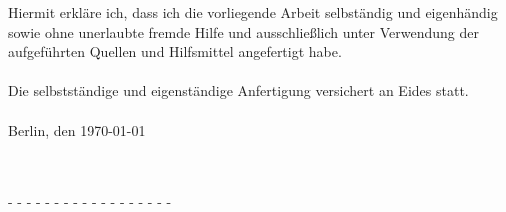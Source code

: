 
\thispagestyle{fancy}
\newpage
\noindent
Hiermit erkläre ich, dass ich die vorliegende Arbeit selbständig und eigenhändig sowie
ohne unerlaubte fremde Hilfe und ausschließlich unter Verwendung der aufgeführten Quellen und Hilfsmittel angefertigt habe.
\\
\\
Die selbstständige und eigenständige Anfertigung versichert an Eides statt.
\\
\\
Berlin, den \today
\vspace{1cm}
\begin{tabular}{@{}l@{}}\hline
\end{tabular}
\\
\vspace{1cm}
 - - - - - - - - - - - - - - - - - - 




